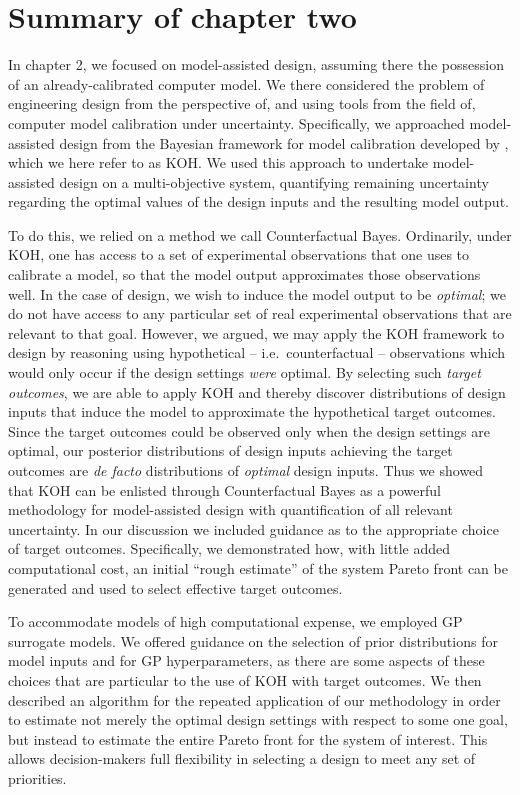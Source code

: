 \documentclass[10pt,a4paper]{article}
\begin{document}
\section{Summary of chapter two}

In chapter 2, we focused on model-assisted design, assuming there the possession of an already-calibrated computer model.
We there considered the problem of engineering design from the perspective of, and using tools from the field of, computer model calibration under uncertainty.
Specifically, we approached model-assisted design from the Bayesian framework for model calibration developed by \citet{Kennedy2001}, which we here refer to as KOH.
We used this approach to undertake model-assisted design on a multi-objective system, quantifying remaining uncertainty regarding the optimal values of the design inputs and the resulting model output.

To do this, we relied on a method we call Counterfactual Bayes.
Ordinarily, under KOH, one has access to a set of experimental observations that one uses to calibrate a model, so that the model output approximates those observations well.
In the case of design, we wish to induce the model output to be \textit{optimal}; we do not have access to any particular set of real experimental observations that are relevant to that goal.
However, we argued, we may apply the KOH framework to design by reasoning using hypothetical -- i.e.\ counterfactual -- observations which would only occur if the design settings \textit{were} optimal.
By selecting such \textit{target outcomes}, we are able to apply KOH and thereby discover distributions of design inputs that induce the model to approximate the hypothetical target outcomes.
Since the target outcomes could be observed only when the design settings are optimal, our posterior distributions of design inputs achieving the target outcomes are \textit{de facto} distributions of \textit{optimal} design inputs.
Thus we showed that KOH can be enlisted through Counterfactual Bayes as a powerful methodology for model-assisted design with quantification of all relevant uncertainty.
In our discussion we included guidance as to the appropriate choice of target outcomes.
Specifically, we demonstrated how, with little added computational cost, an initial ``rough estimate'' of the system Pareto front can be generated and used to select effective target outcomes.

To accommodate models of high computational expense, we employed GP surrogate models.
We offered guidance on the selection of prior distributions for model inputs and for GP hyperparameters, as there are some aspects of these choices that are particular to the use of KOH with target outcomes.
We then described an algorithm for the repeated application of our methodology in order to estimate not merely the optimal design settings with respect to some one goal, but instead to estimate the entire Pareto front for the system of interest.
This allows decision-makers full flexibility in selecting a design to meet any set of priorities.
\end{document}
